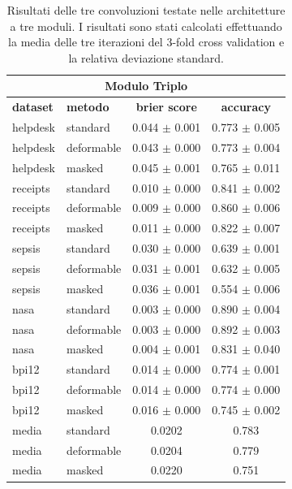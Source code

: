 \documentclass[12pt,a4paper]{report}
\begin{document}
    \begin{table}[t]
    \caption{Risultati delle tre convoluzioni testate nelle architetture
        a tre moduli. I risultati sono stati calcolati effettuando 
        la media delle tre iterazioni del 3-fold cross validation e la 
        relativa deviazione standard.}
    \begin{center} \label{table:results3}
    \begin{tabular}{llcc}
    \hline
    \multicolumn{4}{c}{\textbf{Modulo Triplo}} \\
    \hline
    \textbf{dataset} & \textbf{metodo} & \textbf{brier score} & \textbf{accuracy} \\
    \hline
    helpdesk & standard    & 0.044 $\pm$ 0.001 & 0.773 $\pm$ 0.005 \\
    helpdesk & deformable  & 0.043 $\pm$ 0.000 & 0.773 $\pm$ 0.004 \\
    helpdesk & masked      & 0.045 $\pm$ 0.001 & 0.765 $\pm$ 0.011 \\
    \hline
    receipts & standard    & 0.010 $\pm$ 0.000 & 0.841 $\pm$ 0.002 \\
    receipts & deformable  & 0.009 $\pm$ 0.000 & 0.860 $\pm$ 0.006 \\
    receipts & masked      & 0.011 $\pm$ 0.000 & 0.822 $\pm$ 0.007 \\
    \hline
    sepsis   & standard    & 0.030 $\pm$ 0.000 & 0.639 $\pm$ 0.001 \\
    sepsis   & deformable  & 0.031 $\pm$ 0.001 & 0.632 $\pm$ 0.005 \\
    sepsis   & masked      & 0.036 $\pm$ 0.001 & 0.554 $\pm$ 0.006 \\
    \hline
    nasa     & standard    & 0.003 $\pm$ 0.000 & 0.890 $\pm$ 0.004 \\
    nasa     & deformable  & 0.003 $\pm$ 0.000 & 0.892 $\pm$ 0.003 \\
    nasa     & masked      & 0.004 $\pm$ 0.001 & 0.831 $\pm$ 0.040 \\
    \hline
    bpi12    & standard    & 0.014 $\pm$ 0.000 & 0.774 $\pm$ 0.001 \\
    bpi12    & deformable  & 0.014 $\pm$ 0.000 & 0.774 $\pm$ 0.000 \\
    bpi12    & masked      & 0.016 $\pm$ 0.000 & 0.745 $\pm$ 0.002 \\
    \hline
    media    & standard    & 0.0202 & 0.783 \\
    media    & deformable  & 0.0204 & 0.779 \\
    media    & masked      & 0.0220 & 0.751 \\
    \hline
    \end{tabular}
    \end{center}
    \end{table}
\end{document}
